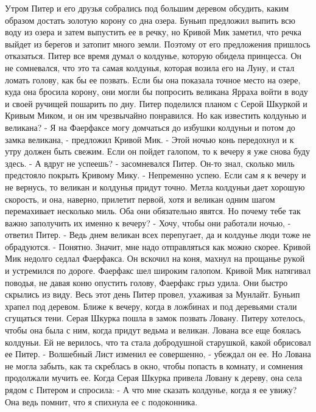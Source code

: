     Утром Питер и его друзья собрались под большим деревом обсудить, 
каким образом достать золотую корону со дна озера.
    Буньип предложил выпить всю воду из озера и затем выпустить ее в 
речку, но Кривой Мик заметил, что речка выйдет из берегов и затопит 
много земли. Поэтому от его предложения пришлось отказаться.
    Питер все время думал о колдунье, которую обидела принцесса. Он не 
сомневался, что это та самая колдунья, которая возила его на Луну, и 
стал ломать голову, как бы ее позвать. Если бы она показала точное 
место на озере, куда она бросила корону, они могли бы попросить 
великана Ярраха войти в воду и своей ручищей пошарить по дну.
    Питер поделился планом с Серой Шкуркой и Кривым Миком, и он им 
чрезвычайно понравился. Но как известить колдунью и великана?
    - Я на Фаерфаксе могу домчаться до избушки колдуньи и потом до 
замка великана, - предложил Кривой Мик. - Этой ночью конь передохнул и 
к утру должен быть свежим. Если он пойдет галопом, то к вечеру я уже 
снова буду здесь.
    - А вдруг не успеешь? - засомневался Питер. Он-то знал, сколько 
миль предстояло покрыть Кривому Мику.
    - Непременно успею. Если сам я к вечеру и не вернусь, то великан и 
колдунья придут точно. Метла колдуньи дает хорошую скорость, и она, 
наверно, прилетит первой, хотя и великан одним шагом перемахивает 
несколько миль. Оба они обязательно явятся. Но почему тебе так важно 
заполучить их именно к вечеру?
    - Хочу, чтобы они работали ночью, - ответил Питер. - Ведь днем 
великан всех перепугает, да и колдунье люди тоже не обрадуются.
    - Понятно. Значит, мне надо отправляться как можно скорее.
    Кривой Мик недолго седлал Фаерфакса. Он вскочил на коня, махнул на 
прощанье рукой и устремился по дороге. Фаерфакс шел широким галопом. 
Кривой Мик натягивал поводья, не давая коню опустить голову, Фаерфакс 
грыз удила. Они быстро скрылись из виду.
    Весь этот день Питер провел, ухаживая за Мунлайт. Буньип храпел 
под деревом. Ближе к вечеру, когда в ложбинах и под деревьями стали 
сгущаться тени. Серая Шкурка пошла в замок позвать Ловану. Питеру 
хотелось, чтобы она была с ним, когда придут ведьма и великан.
    Лована все еще боялась колдуньи. Ей не верилось, что та стала 
добродушной старушкой, какой обрисовал ее Питер.
    - Волшебный Лист изменил ее совершенно, - убеждал он ее.
    Но Лована не могла забыть, как та скреблась в окно, чтобы попасть 
в комнату, и сомнения продолжали мучить ее.
    Когда Серая Шкурка привела Ловану к дереву, она села рядом с 
Питером и спросила:
    - А что мне сказать колдунье, когда я ее увижу? Она ведь помнит, 
что я спихнула ее с подоконника.

